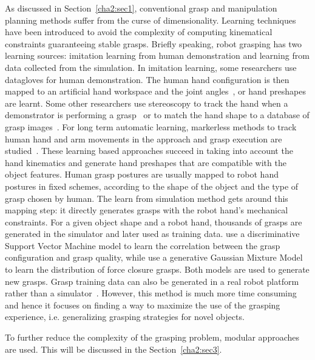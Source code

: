 As discussed in Section~\ref{cha2:sec1},
conventional grasp and manipulation planning methods suffer from the curse of dimensionality.
Learning techniques have been introduced to avoid the complexity of computing kinematical constraints guaranteeing stable grasps. Briefly speaking, robot grasping has two learning sources: imitation learning from human demonstration and learning from data collected from the simulation.
In imitation learning, some researchers use datagloves for human demonstration. The human hand configuration is then mapped to an artificial hand workspace and the joint angles~\citep{Fischer1998,ekvall2007learning}, or hand preshapes~\citep{Kyota2005, pelossof2004svm, Li07} are learnt. Some other researchers use stereoscopy to track the hand when a demonstrator is performing a grasp~\citep{hueser2006learning} or to match the hand shape to a database of grasp images~\citep{Romero2008}. For long term automatic learning, markerless methods to track human hand and arm movements in the approach and grasp execution are studied~\citep{ekvall2007learning,do2009grasp}. These learning based approaches succeed in taking into account the hand kinematics and generate hand preshapes that are compatible with the object features.
Human grasp postures are usually mapped to robot hand postures in fixed schemes, according to the shape of the object and the type of grasp chosen by human.
The learn from simulation method gets around this mapping step: it directly generates grasps with the robot hand's mechanical constraints. For a given object shape and a robot hand, thousands of grasps are generated in the simulator and later used as training data. \citet{pelossof2004svm} use a discriminative Support Vector Machine model to learn the correlation between the grasp configuration and grasp quality, while \citet{bidan2013grasp} use a generative Gaussian Mixture Model to learn the distribution of force closure grasps. Both models are used to generate new grasps. Grasp training data can also be generated in a real robot platform rather than a simulator~\citep{herzog2014learning}. However, this method is much more time consuming and hence it focuses on finding a way to maximize the use of the grasping experience, i.e. generalizing grasping strategies for novel objects.

To further reduce the complexity of the grasping problem, modular approaches are used. This will be discussed in the Section~\ref{cha2:sec3}.


